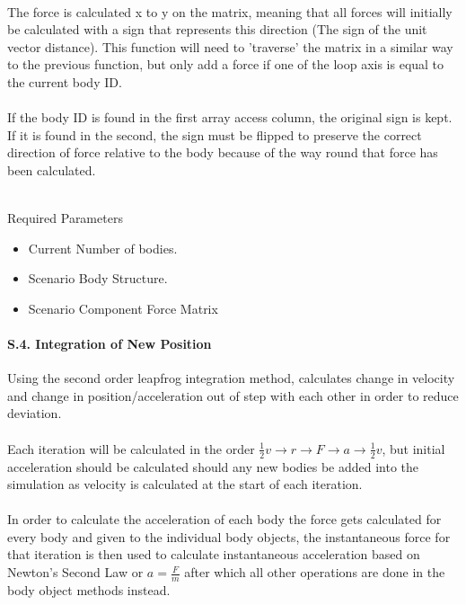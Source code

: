 \paragraph{}
The force is calculated x to y on the matrix, meaning that all forces will initially be calculated with a sign that represents this direction (The sign of the unit vector distance).
This function will need to 'traverse' the matrix in a similar way to the previous function, but only add a force if one of the loop axis is equal to the current body ID.

\paragraph{} If the body ID is found in the first array access column, the original sign is kept. If it is found in the second, the sign must be flipped to preserve the correct direction of force relative to the body because of the way round that force has been calculated. \\\

Required Parameters
\begin{itemize}
\item Current Number of bodies.
\item Scenario Body Structure.
\item Scenario Component Force Matrix
\end{itemize}

\pagebreak
\paragraph{S.4. Integration of New Position}
Using the second order leapfrog integration method, calculates change in velocity and change in position/acceleration out of step with each other in order to reduce deviation.

\paragraph{}
Each iteration will be calculated in the order $\frac{1}{2}v \rightarrow r \rightarrow F \rightarrow a \rightarrow \frac{1}{2}v$, but initial acceleration should be calculated should any new bodies be added into the simulation as velocity is calculated at the start of each iteration.

\paragraph{}
In order to calculate the acceleration of each body the force gets calculated for every body and given to the individual body objects, the instantaneous force for that iteration is then used to calculate instantaneous acceleration based on Newton's Second Law or $a=\frac{F}{m}$ after which all other operations are done in the body object methods instead.

